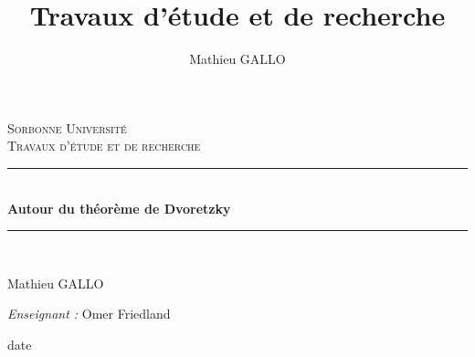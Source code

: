 \documentclass{report}
\author{Mathieu GALLO}
\title{Travaux d'étude et de recherche}
\newcommand{\HRule}{\rule{\linewidth}{0.5mm}}
\begin{document}
	
\begin{titlepage}

	\begin{center}
		
		\textsc{\LARGE Sorbonne Université}\\[2cm]
		
		\textsc{\Large Travaux d'étude et de recherche}\\[1.5cm]
		

		\HRule \\[0.4cm]
		{ \huge \bfseries Autour du théorème de Dvoretzky\\[0.4cm] }
		
		\HRule \\[2cm]
		
		
		\begin{minipage}{0.4\textwidth}
			\begin{flushleft} \large
				Mathieu GALLO \\
			\end{flushleft}
		\end{minipage}
		\begin{minipage}{0.4\textwidth}
			\begin{flushright} \large
				\emph{Enseignant :} Omer Friedland\\
			\end{flushright}
		\end{minipage}
		
		\vfill
		{\large date}
		
	\end{center}
\end{titlepage}
\end{document}
